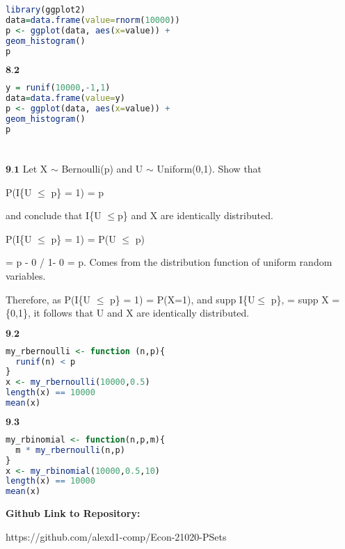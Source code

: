 \begin{lstlisting}[language=R]
library(ggplot2)
data=data.frame(value=rnorm(10000))
p <- ggplot(data, aes(x=value)) + 
geom_histogram()
p
\end{lstlisting}


$\textbf{8.2}$
\begin{lstlisting}[language=R]
y = runif(10000,-1,1)
data=data.frame(value=y)
p <- ggplot(data, aes(x=value)) + 
geom_histogram()
p
\end{lstlisting}

\newpage
\section{}

$\textbf{9.1}$ Let X $\sim$ Bernoulli(p) and U $\sim$ Uniform(0,1). Show that

P(I{\{U $\leq$ p}\} = 1) = p

and conclude that I\{U $\leq$p\} and X are identically distributed. 

P(I{\{U $\leq$ p}\} = 1) = P(U $\leq$ p)

= p - 0 / 1- 0  = p. Comes from the distribution function of uniform random variables.

Therefore, as P(I{\{U $\leq$ p}\} = 1) = P(X=1), and supp I\{U$\leq$ p\}, = supp X = \{0,1\}, it follows that U and X are identically distributed.

$\textbf{9.2}$

\begin{lstlisting}[language=R]
my_rbernoulli <- function (n,p){
  runif(n) < p
}
x <- my_rbernoulli(10000,0.5)
length(x) == 10000
mean(x)
\end{lstlisting}

$\textbf{9.3}$

\begin{lstlisting}[language=R]
my_rbinomial <- function(n,p,m){
  m * my_rbernoulli(n,p)
}
x <- my_rbinomial(10000,0.5,10)
length(x) == 10000
mean(x)
\end{lstlisting}


\newpage
\textbf{Github Link to Repository:}

https://github.com/alexd1-comp/Econ-21020-PSets




